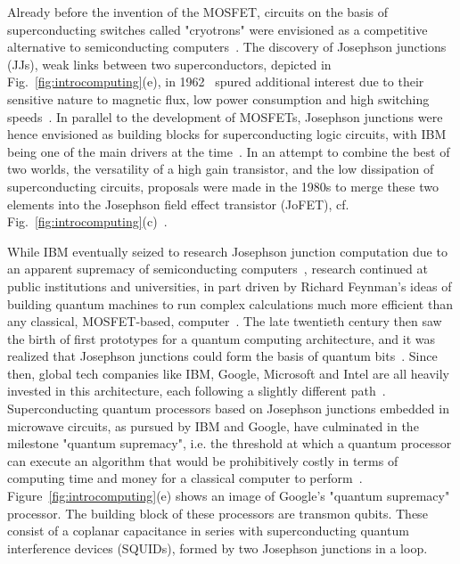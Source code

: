 Already before the invention of the MOSFET, circuits on the basis of superconducting switches called "cryotrons" were envisioned as a competitive alternative to semiconducting computers~\cite{buckCryotronASuperconductiveComputer1956,brockWillNSAFinally}.
%
The discovery of Josephson junctions (JJs), weak links between two superconductors, depicted in Fig.~\ref{fig:introcomputing}(e), in 1962~\cite{josephsonPossibleNewEffects1962,andersonProbableObservationJosephson1963} spured additional interest due to their sensitive nature to magnetic flux, low power consumption and high switching speeds~\cite{mcdonaldPicosecondApplicationsJosephson1980}.
%
In parallel to the development of MOSFETs, Josephson junctions were hence envisioned as building blocks for superconducting logic circuits, with IBM being one of the main drivers at the time~\cite{anackerJosephsonComputerTechnology1980a}.
%
In an attempt to combine the best of two worlds, the versatility of a high gain transistor, and the low dissipation of superconducting circuits, proposals were made in the 1980s to merge these two elements into the Josephson field effect transistor (JoFET), cf. Fig.~\ref{fig:introcomputing}(c)~\cite{clarkFeasibilityHybridJosephson1980,gallagherThreeterminalSuperconductingDevices1985}.


While IBM eventually seized to research Josephson junction computation due to an apparent supremacy of semiconducting computers~\cite{robinsonIBMDropsSuperconducting1983}, research continued at public institutions and universities, in part driven by Richard Feynman's ideas of building quantum machines to run complex calculations much more efficient than any classical, MOSFET-based, computer~\cite{feynmanSimulatingPhysicsComputers1982}.
%
The late twentieth century then saw the birth of first prototypes for a quantum computing architecture, and it was realized that Josephson junctions could form the basis of quantum bits~\cite{martinisQuantumJosephsonJunction2020}.
%
Since then, global tech companies like IBM, Google, Microsoft and Intel are all heavily invested in this architecture, each following a slightly different path~\cite{steffenQuantumComputingIBM2011,aruteQuantumSupremacyUsing2019,linnNewMicrosoftBreakthroughs2020,vandersypenQuantumComputingSemiconductor2019}.
%
Superconducting quantum processors based on Josephson junctions embedded in microwave circuits, as pursued by IBM and Google, have culminated in the milestone "quantum supremacy", i.e. the threshold at which a quantum processor can execute an algorithm that would be prohibitively costly in terms of computing time and money for a classical computer to perform~\cite{aruteQuantumSupremacyUsing2019}.
%
Figure~\ref{fig:introcomputing}(e) shows an image of Google's "quantum supremacy" processor.
%
The building block of these processors are transmon qubits.
%
These consist of a coplanar capacitance in series with superconducting quantum interference devices (SQUIDs), formed by two Josephson junctions in a loop.



